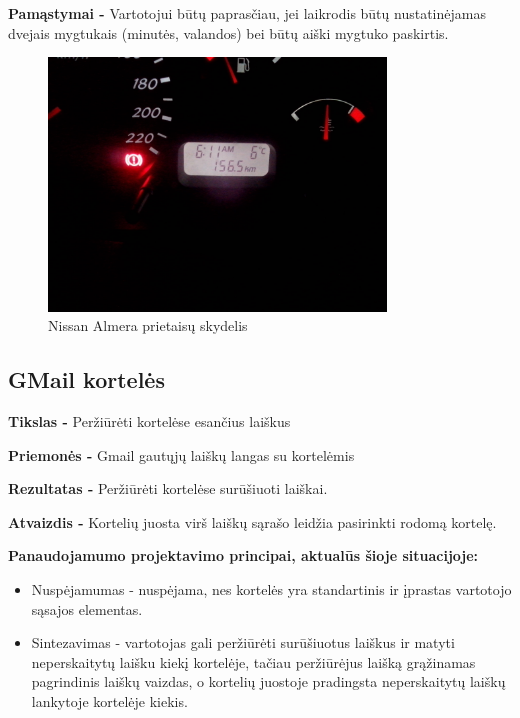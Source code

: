 ﻿\documentclass[a4paper, 12pt]{article}
\begin{document}
		\textbf{Pamąstymai -}
		Vartotojui būtų paprasčiau, jei laikrodis būtų nustatinėjamas dvejais mygtukais (minutės, valandos)
		bei būtų aiški mygtuko paskirtis.

		\begin{figure}[h]
		\centering
		\includegraphics[width=0.8\textwidth]{images/almera.jpg}
		\caption{Nissan Almera prietaisų skydelis}
		\label{almera}
		\end{figure}
		
	\subsection{GMail kortelės}
		\textbf{Tikslas -}
		Peržiūrėti kortelėse esančius laiškus

		\textbf{Priemonės -}
		Gmail gautųjų laiškų langas su kortelėmis
		
		\textbf{Rezultatas -}
		Peržiūrėti kortelėse surūšiuoti laiškai.

		\textbf{Atvaizdis -}
		Kortelių juosta virš laiškų sąrašo leidžia pasirinkti rodomą kortelę.
		
		\textbf{Panaudojamumo projektavimo principai, aktualūs šioje situacijoje:}
		\begin{itemize}
		\item Nuspėjamumas - nuspėjama, nes kortelės yra standartinis ir įprastas vartotojo sąsajos elementas.
		\item Sintezavimas - vartotojas gali peržiūrėti surūšiuotus laiškus ir matyti neperskaitytų laišku kiekį kortelėje, tačiau peržiūrėjus laišką grąžinamas pagrindinis laiškų vaizdas, o kortelių juostoje pradingsta neperskaitytų laiškų lankytoje kortelėje kiekis.	
		\end{itemize}
\end{document}
